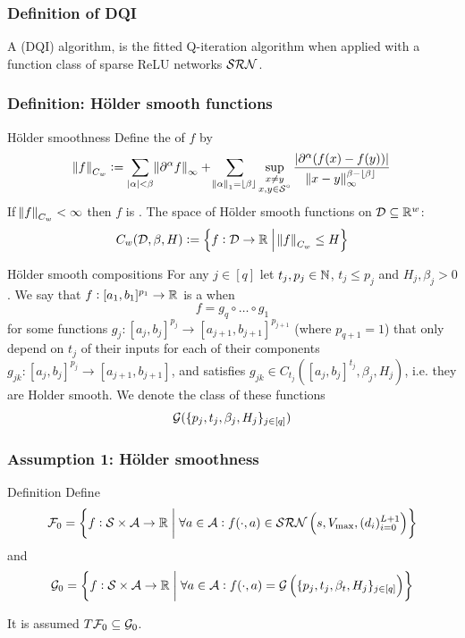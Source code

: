\documentclass{beamer}[10]
\begin{document}
\begin{frame}
  \frametitle{Definition of DQI}
  A  (DQI) algorithm,
  is the fitted Q-iteration algorithm when applied with a function class
  of sparse ReLU networks $\mathcal{SRN}$.
\end{frame}

\begin{frame}
  \frametitle{Definition: Hölder smooth functions}
  \begingroup \tiny
  \begin{block}{Hölder smoothness}
    Define the  of $f$ by
    \begin{equation*}
      \norm{f}_{C_w} \vcentcolon= 
      \sum_{|{\alpha}| < \beta}
      \norm{\partial^{\alpha}f}_\infty +
      \sum_{\norm{{\alpha}}_1 = \lfloor\beta\rfloor}
      \sup_{\substack{x \neq y \\ x, y \in \mathcal{S}^\circ}}
      \frac{|\partial^\alpha (f(x) - f(y))|}
      {\norm{x-y}_\infty^{\beta-\lfloor\beta\rfloor}}
    \end{equation*}
    If $\norm{f}_{C_w} < \infty$ then $f$ is .
    The space of Hölder smooth functions on $\mathcal{D} \subseteq \mathbb{R}^w$:
    \[ C_w(\mathcal{D}, \beta, H) \vcentcolon=
    \left\{ f : \mathcal{D} \to \mathbb{R} \;\middle\vert\; \norm{f}_{C_w} \leq H \right\} \]
  \end{block}
  \begin{block}{Hölder smooth compositions}
    For any $j \in [q]$ let $t_j, p_j
    \in \mathbb{N}$, $t_j\leq p_j$ and $H_j, \beta_j > 0$.
    We say that $f:[a_1, b_1]^{p_1} \to \mathbb{R}$
    is a  when
    \[ f = g_q \circ \dots \circ g_1 \]
    for some functions $g_j : [a_j, b_j]^{p_j} \to [a_{j+1}, b_{j+1}]^{p_{j+1}}$
    (where $p_{q+1} = 1$)
    that only depend on $t_j$ of their inputs
    for each of their components $g_{jk}:[a_j, b_j]^{p_j} \to [a_{j+1}, b_{j+1}]$,
    and satisfies $g_{jk} \in C_{t_j}([a_j, b_j]^{t_j}, \beta_j, H_j)$, 
    i.e. they are Holder smooth.
    We denote the class of these functions
    \[ \mathcal{G}(\{p_j, t_j, \beta_j, H_j\}_{j \in [q]}) \]
  \end{block}
  \endgroup
\end{frame}

\begin{frame}
  \frametitle{Assumption 1: Hölder smoothness}
  \begingroup \footnotesize
  \begin{block}{Definition}
    Define
    \[ \mathcal{F}_0 = \left\{ f : \mathcal{S} \times \mathcal{A} \to \mathbb{R} \;\middle\vert\;
	\forall a \in \mathcal{A} : f(\cdot, a) \in \mathcal{SRN}\left( s, V_{\max},
    (d_i)_{i=0}^{L+1} \right) \right\} \]
    and
    \[ \mathcal{G}_0 = \left\{ f : \mathcal{S} \times \mathcal{A} \to \mathbb{R}
	\;\middle\vert\; \forall a \in \mathcal{A} :
	f(\cdot, a) = \mathcal{G}\left(\{p_j, t_j, \beta_t, H_j\}_{j \in [q]} \right)
    \right\} \]
  \end{block}
  It is assumed $ T \mathcal{F}_0 \subseteq \mathcal{G}_0$.
    \endgroup
\end{frame}
\end{document}
